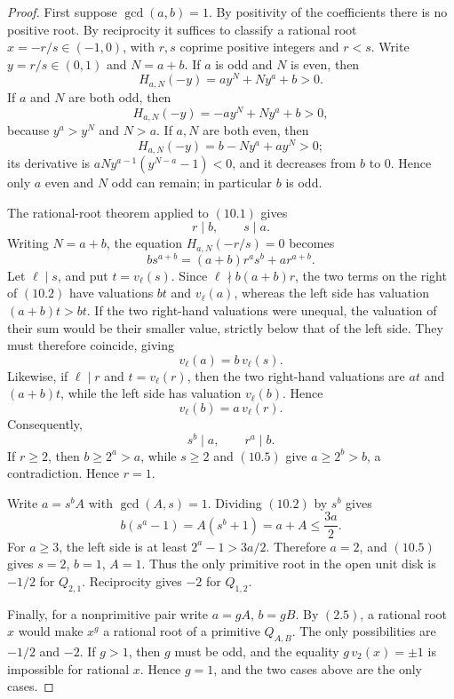 \documentclass[11pt]{article}
\theoremstyle{definition}
\begin{document}
\begin{proof}
First suppose \(\gcd(a,b)=1\).  By positivity of the coefficients there is no
positive root.  By reciprocity it suffices to classify a rational root
\(x=-r/s\in(-1,0)\), with \(r,s\) coprime positive integers and \(r<s\).
Write $y=r/s\in(0,1)$ and $N=a+b$.  If \(a\) is odd and \(N\) is even, then
\[
 H_{a,N}(-y)=ay^N+Ny^a+b>0.
\]
If \(a\) and \(N\) are both odd, then
\[
 H_{a,N}(-y)=-ay^N+Ny^a+b>0,
\]
because \(y^a>y^N\) and \(N>a\).  If \(a,N\) are both even, then
\[
 H_{a,N}(-y)=b-Ny^a+ay^N>0;
\]
its derivative is \(aN y^{a-1}(y^{N-a}-1)<0\), and it decreases from
\(b\) to \(0\).  Hence only \(a\) even and \(N\) odd can remain; in
particular \(b\) is odd.

The rational-root theorem applied to \((10.1)\) gives
\[
 r\mid b,\qquad s\mid a.
\]
Writing \(N=a+b\), the equation \(H_{a,N}(-r/s)=0\) becomes
\begin{equation}
 b s^{a+b}=(a+b)r^a s^b+a r^{a+b}.
 \tag{10.2}
\end{equation}
Let \(\ell\mid s\), and put \(t=v_\ell(s)\).  Since
\(\ell\nmid b(a+b)r\), the two terms on the right of \((10.2)\) have
valuations \(bt\) and \(v_\ell(a)\), whereas the left side has valuation
\((a+b)t>bt\).  If the two right-hand valuations were unequal, the
valuation of their sum would be their smaller value, strictly below that of
the left side.  They must therefore coincide, giving
\begin{equation}
 v_\ell(a)=b\,v_\ell(s).
 \tag{10.3}
\end{equation}
Likewise, if \(\ell\mid r\) and \(t=v_\ell(r)\), then the two right-hand
valuations are \(at\) and \((a+b)t\), while the left side has valuation
\(v_\ell(b)\).  Hence
\begin{equation}
 v_\ell(b)=a\,v_\ell(r).
 \tag{10.4}
\end{equation}
Consequently,
\begin{equation}
 s^b\mid a,
 \qquad
 r^a\mid b.
 \tag{10.5}
\end{equation}
If \(r\geq2\), then \(b\geq2^a>a\), while \(s\geq2\) and \((10.5)\) give
\(a\geq2^b>b\), a contradiction.  Hence \(r=1\).

Write \(a=s^bA\) with \(\gcd(A,s)=1\).  Dividing \((10.2)\) by \(s^b\)
gives
\begin{equation}
 b(s^a-1)=A(s^b+1)=a+A\leq\frac{3a}{2}.
 \tag{10.6}
\end{equation}
For \(a\geq3\), the left side is at least \(2^a-1>3a/2\).  Therefore
\(a=2\), and \((10.5)\) gives \(s=2\), \(b=1\), \(A=1\).  Thus the only
primitive root in the open unit disk is \(-1/2\) for \(Q_{2,1}\).  Reciprocity
gives \(-2\) for \(Q_{1,2}\).

Finally, for a nonprimitive pair write \(a=gA\), \(b=gB\).  By \((2.5)\), a
rational root \(x\) would make \(x^g\) a rational root of a primitive
\(Q_{A,B}\).  The only possibilities are \(-1/2\) and \(-2\).  If \(g>1\), then \(g\)
must be odd, and the equality \(g\,v_2(x)=\pm1\) is impossible for rational
\(x\).  Hence \(g=1\), and the two cases above are the only cases.
\end{proof}
\end{document}
